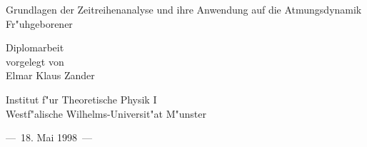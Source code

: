 \hbox{}
\vspace{3cm}

\begin{center}
\sectfont \LARGE
Grundlagen der Zeitreihenanalyse und ihre Anwendung auf die Atmungsdynamik
Fr"uhgeborener\\
\end{center}

\vspace{3cm}
\begin{center}
\large
Diplomarbeit \\
vorgelegt von \\
Elmar Klaus Zander
\end{center}

\vspace{3cm}
\begin{center}
\large
Institut f"ur Theoretische Physik I\\Westf"alische Wilhelms-Universit"at M"unster
\end{center}

\vspace{3cm}
\begin{center}
\large
---\ 18. Mai 1998\ --- 
\end{center}



